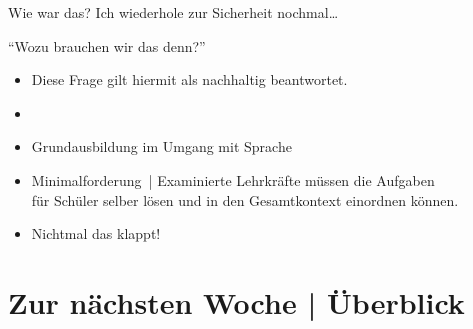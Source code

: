 \begin{frame}
  {Wie war das?}
  Ich wiederhole zur Sicherheit nochmal\ldots\\
  \Zeile
  \onslide<+->
  \begin{center}
    \Large{}
  \end{center}
\end{frame}

\begin{frame}
  {"`Wozu brauchen wir das denn?"'}
  \onslide<+->
  \begin{itemize}[<+->]
    \item Diese Frage gilt hiermit als nachhaltig beantwortet.
      \Zeile
    \item {}
    \item Grundausbildung im \alert{Umgang mit Sprache} 
      \Zeile
    \item Minimalforderung | \alert{Examinierte Lehrkräfte müssen die Aufgaben\\
         für Schüler selber lösen und in den Gesamtkontext einordnen können.}
       \item Nichtmal das klappt!  \citet{SchaeferSayatz2017a}
  \end{itemize}
\end{frame}

\section{Zur nächsten Woche | Überblick}

